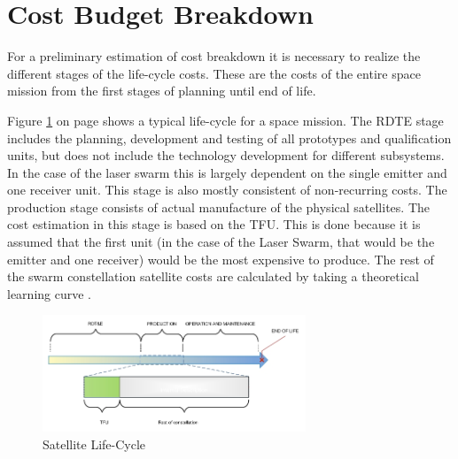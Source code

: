 \section{Cost Budget Breakdown}
\label{blBudgetCost}
For a preliminary estimation of cost breakdown it is necessary to realize the different stages of the life-cycle costs. These are the costs of the entire space mission from the first stages of planning until end of life.
%


Figure \ref{fig:lifecycle} on page \pageref{fig:lifecycle} shows a typical life-cycle for a space mission. The \ac{RDTE} stage includes the planning, development and testing of all prototypes and qualification units, but does not include the technology development for different subsystems. In the case of the laser swarm this is largely dependent on the single emitter and one receiver unit. This stage is also mostly consistent of non-recurring costs. The production stage consists of actual manufacture of the physical satellites. The cost estimation in this stage is based on the \ac{TFU}. This is done because it is assumed that the first unit (in the case of the Laser Swarm, that would be the emitter and one receiver) would be the most expensive to produce. The rest of the swarm constellation satellite costs are calculated by taking a theoretical learning curve \cite{larson}. 

\begin{figure}[!h]
\begin{center}

\includegraphics[width=0.7\textwidth]{chapters/img/lifetime.jpg}
\caption{Satellite Life-Cycle}
\label{fig:lifecycle}
\end{center}
\end{figure}

